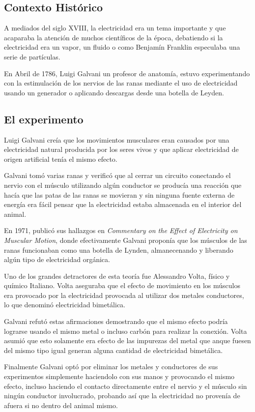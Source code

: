 \documentclass[journal]{IEEEtran}
\begin{document}
\subsection{Contexto Histórico}
A mediados del siglo XVIII, la electricidad era un tema importante y que acaparaba la atención 
de muchos científicos de la época, debatiendo si la electricidad era un vapor, un fluido o como Benjamín
Franklin especulaba una serie de partículas.

En Abril de 1786, Luigi Galvani un profesor de anatomía, estuvo experimentando con la estimulación de los nervios
de las ranas mediante el uso de electricidad usando un generador o aplicando descargas desde una botella de Leyden.

\subsection{El experimento}
Luigi Galvani creía que los movimientos musculares eran causados por una electricidad natural producida 
por los seres vivos y que aplicar electricidad de origen artificial tenía el mismo efecto.

Galvani tomó varias ranas y verificó que al cerrar un circuito conectando el nervio con el músculo utilizando algún conductor 
se producía una reacción que hacía que las patas de las ranas se movieran y sin ninguna fuente externa de energía 
era fácil pensar que la electricidad estaba almacenada en el interior del animal.

En 1971, publicó sus hallazgos en \emph{Commentary on the Effect of Electricity on Muscular Motion}, donde efectivamente Galvani proponía que 
los músculos de las ranas funcionaban como una botella de Lynden, almanecenando y liberando algún tipo de electricidad orgánica.

Uno de los grandes detractores de esta teoría fue Alessandro Volta, físico y químico Italiano. Volta aseguraba que el efecto de movimiento en 
los músculos era provocado por la electricidad provocada al utilizar dos metales conductores, lo que denominó electricidad bimetálica.

Galvani refutó estas afirmaciones demostrando que el mismo efecto podría lograrse usando el mismo metal o incluso carbón para realizar la conexión.
Volta asumió que esto solamente era efecto de las impurezas del metal que anque fuesen del mismo tipo igual generan alguna 
cantidad de electricidad bimetálica.

Finalmente Galvani optó por eliminar los metales y conductores de sus experimentos simplemente haciendolo con sus manos y provocando el mismo efecto, incluso haciendo el contacto directamente entre el nervio 
y el músculo sin ningún conductor involucrado, probando así que la electricidad no provenía de afuera si no dentro del animal mismo.
\end{document}

